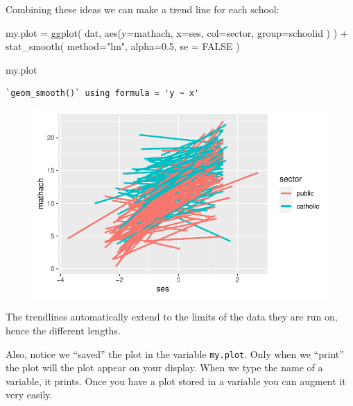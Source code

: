 \documentclass[
  letterpaper,
  DIV=11,
  numbers=noendperiod]{scrreprt}
\newenvironment{Shaded}{\begin{snugshade}}{\end{snugshade}}
\newcommand{\AttributeTok}[1]{\textcolor[rgb]{0.49,0.56,0.16}{#1}}
\newcommand{\ConstantTok}[1]{\textcolor[rgb]{0.53,0.00,0.00}{#1}}
\newcommand{\FloatTok}[1]{\textcolor[rgb]{0.25,0.63,0.44}{#1}}
\newcommand{\FunctionTok}[1]{\textcolor[rgb]{0.02,0.16,0.49}{#1}}
\newcommand{\NormalTok}[1]{\textcolor[rgb]{0.00,0.44,0.13}{#1}}
\newcommand{\OtherTok}[1]{\textcolor[rgb]{0.00,0.44,0.13}{#1}}
\newcommand{\SpecialCharTok}[1]{\textcolor[rgb]{0.25,0.44,0.63}{#1}}
\newcommand{\StringTok}[1]{\textcolor[rgb]{0.25,0.44,0.63}{#1}}
\begin{document}
Combining these ideas we can make a trend line for each school:

\begin{Shaded}
\begin{Highlighting}[]
\NormalTok{my.plot }\OtherTok{=} \FunctionTok{ggplot}\NormalTok{( dat, }\FunctionTok{aes}\NormalTok{(}\AttributeTok{y=}\NormalTok{mathach, }\AttributeTok{x=}\NormalTok{ses, }\AttributeTok{col=}\NormalTok{sector, }\AttributeTok{group=}\NormalTok{schoolid ) ) }\SpecialCharTok{+} 
    \FunctionTok{stat\_smooth}\NormalTok{( }\AttributeTok{method=}\StringTok{"lm"}\NormalTok{, }\AttributeTok{alpha=}\FloatTok{0.5}\NormalTok{, }\AttributeTok{se =} \ConstantTok{FALSE}\NormalTok{ )}

\NormalTok{my.plot}
\end{Highlighting}
\end{Shaded}

\begin{verbatim}
`geom_smooth()` using formula = 'y ~ x'
\end{verbatim}

\begin{figure}[H]

{\centering \includegraphics{intro_ggplot_files/figure-pdf/unnamed-chunk-6-1.pdf}

}

\end{figure}

The trendlines automatically extend to the limits of the data they are
run on, hence the different lengths.

Also, notice we ``saved'' the plot in the variable \texttt{my.plot}.
Only when we ``print'' the plot will the plot appear on your display.
When we type the name of a variable, it prints. Once you have a plot
stored in a variable you can augment it very easily.
\end{document}
